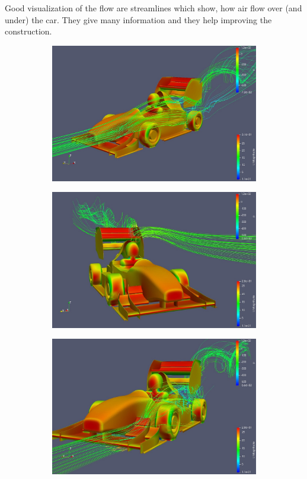 \newpage
Good visualization of the flow are streamlines which show, how air flow over (and under) the car. They give many information and they help improving the construction. 
\begin{figure}[h!]
	\centering
    \begin{subfigure}[b]{0.49\textwidth}
    \includegraphics[width=\textwidth]{linie.jpg}
    \end{subfigure}
    \begin{subfigure}[b]{0.49\textwidth}
    	\includegraphics[width=\textwidth]{linie2.jpg}
    \end{subfigure}
    \begin{subfigure}[b]{0.49\textwidth}
    \includegraphics[width=\textwidth]{linie3.jpg}

\end{subfigure}
\end{figure}
